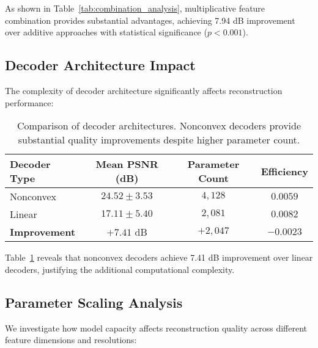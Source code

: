 \documentclass[10pt,twocolumn,letterpaper]{article}
\begin{document}
As shown in Table~\ref{tab:combination_analysis}, multiplicative feature combination provides substantial advantages, achieving 7.94 dB improvement over additive approaches with statistical significance ($p < 0.001$).

\subsection{Decoder Architecture Impact}

The complexity of decoder architecture significantly affects reconstruction performance:

\begin{table}[t]
\centering
\small
\begin{tabular}{@{}lccc@{}}
\toprule
\textbf{Decoder Type} & \textbf{Mean PSNR (dB)} & \textbf{Parameter Count} & \textbf{Efficiency} \\
\midrule
Nonconvex & $24.52 \pm 3.53$ & $4,128$ & $0.0059$ \\
Linear & $17.11 \pm 5.40$ & $2,081$ & $0.0082$ \\
\midrule
\textbf{Improvement} & $\mathbf{+7.41}$ dB & $+2,047$ & $-0.0023$ \\
\bottomrule
\end{tabular}
\caption{Comparison of decoder architectures. Nonconvex decoders provide substantial quality improvements despite higher parameter count.}
\label{tab:decoder_comparison}
\end{table}

Table~\ref{tab:decoder_comparison} reveals that nonconvex decoders achieve 7.41 dB improvement over linear decoders, justifying the additional computational complexity.

\subsection{Parameter Scaling Analysis}

We investigate how model capacity affects reconstruction quality across different feature dimensions and resolutions:
\end{document}
